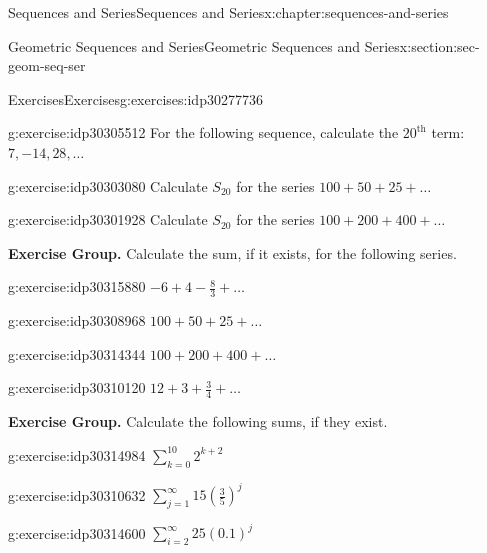 \documentclass[twoside,10pt,]{book}
\numberwithin{equation}{section}
\newcommand{\upth}[1]{{#1^{\text{th}}}}
\begin{document}
\begin{chapterptx}{Sequences and Series}{}{Sequences and Series}{}{}{x:chapter:sequences-and-series}
\begin{sectionptx}{Geometric Sequences and Series}{}{Geometric Sequences and Series}{}{}{x:section:sec-geom-seq-ser}
\begin{exercises-subsection}{Exercises}{}{Exercises}{}{}{g:exercises:idp30277736}
\begin{divisionexercise}{20}{}{}{g:exercise:idp30305512}
For the following sequence, calculate the \(\upth{20}\) term:  \(7, -14, 28, \ldots\)\end{divisionexercise}%
\begin{divisionexercise}{21}{}{}{g:exercise:idp30303080}%
Calculate \(S_{20}\) for the series \(100 + 50 + 25 + \ldots\)\end{divisionexercise}%
\begin{divisionexercise}{22}{}{}{g:exercise:idp30301928}%
Calculate \(S_{20}\) for the series \(100 + 200 + 400 + \ldots\)\end{divisionexercise}%
\par\medskip\noindent%
\textbf{Exercise Group.}\space\space%
Calculate the sum, if it exists, for the following series.\begin{exercisegroup}
\begin{divisionexerciseeg}{23}{}{}{g:exercise:idp30315880}%
\(- 6 + 4 - \frac{8}{3} + \ldots\)\end{divisionexerciseeg}%
\begin{divisionexerciseeg}{24}{}{}{g:exercise:idp30308968}%
\(100 + 50 + 25 + \ldots\)\end{divisionexerciseeg}%
\begin{divisionexerciseeg}{25}{}{}{g:exercise:idp30314344}%
\(100 + 200 + 400 + \ldots\)\end{divisionexerciseeg}%
\begin{divisionexerciseeg}{26}{}{}{g:exercise:idp30310120}%
\(12 + 3 + \frac{3}{4}+ \ldots\)\end{divisionexerciseeg}%
\end{exercisegroup}
\par\medskip\noindent
\par\medskip\noindent%
\textbf{Exercise Group.}\space\space%
Calculate the following sums, if they exist.\begin{exercisegroup}
\begin{divisionexerciseeg}{27}{}{}{g:exercise:idp30314984}%
\(\sum\limits_{k = 0}^{10} {{2^{k + 2}}}\)\end{divisionexerciseeg}%
\begin{divisionexerciseeg}{28}{}{}{g:exercise:idp30310632}%
\({\sum\limits_{j = 1}^\infty  {15\left( {\frac{3}{5}} \right)} ^j}\)\end{divisionexerciseeg}%
\begin{divisionexerciseeg}{29}{}{}{g:exercise:idp30314600}%
\(\sum\limits_{i = 2}^\infty  {25{{\left( {0.1} \right)}^j}}\)\end{divisionexerciseeg}%

\end{exercisegroup}
\end{exercises-subsection}
\end{sectionptx}
\end{chapterptx}
\end{document}
